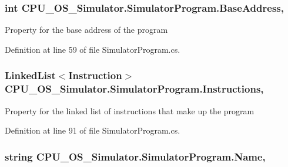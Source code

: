 \subsubsection[{Base\+Address}]{\setlength{\rightskip}{0pt plus 5cm}int C\+P\+U\+\_\+\+O\+S\+\_\+\+Simulator.\+Simulator\+Program.\+Base\+Address\hspace{0.3cm}{\ttfamily [get]}, {\ttfamily [set]}}\label{class_c_p_u___o_s___simulator_1_1_simulator_program_a568c9415fc2be2ba79154438aca2f932}


Property for the base address of the program 



Definition at line 59 of file Simulator\+Program.\+cs.

\hypertarget{class_c_p_u___o_s___simulator_1_1_simulator_program_a4e097e30428645df3a4f7bde49118a02}{}
\subsubsection[{Instructions}]{\setlength{\rightskip}{0pt plus 5cm}Linked\+List$<${\bf Instruction}$>$ C\+P\+U\+\_\+\+O\+S\+\_\+\+Simulator.\+Simulator\+Program.\+Instructions\hspace{0.3cm}{\ttfamily [get]}, {\ttfamily [set]}}\label{class_c_p_u___o_s___simulator_1_1_simulator_program_a4e097e30428645df3a4f7bde49118a02}


Property for the linked list of instructions that make up the program 



Definition at line 91 of file Simulator\+Program.\+cs.

\hypertarget{class_c_p_u___o_s___simulator_1_1_simulator_program_a1f86d599b2126d389a1ed956f98234b3}{}
\subsubsection[{Name}]{\setlength{\rightskip}{0pt plus 5cm}string C\+P\+U\+\_\+\+O\+S\+\_\+\+Simulator.\+Simulator\+Program.\+Name\hspace{0.3cm}{\ttfamily [get]}, {\ttfamily [set]}}\label{class_c_p_u___o_s___simulator_1_1_simulator_program_a1f86d599b2126d389a1ed956f98234b3}


